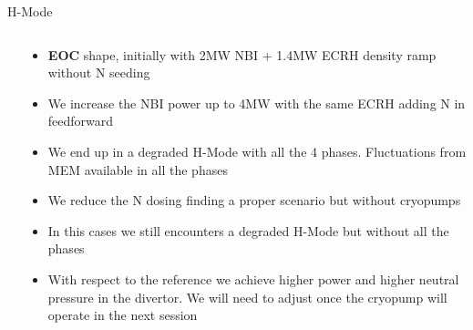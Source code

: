 \documentclass[10pt, compress]{beamer}
\newcommand\Fontvi{\fontsize{8}{7.2}\selectfont}
\begin{document}
\begin{frame}{H-Mode}
\Fontvi
  \vspace{-1cm}
\begin{columns}
  \begin{column}{0.5\textwidth}
  \end{column}
  \begin{column}{0.5\textwidth}
    \begin{itemize}
      \item<1-> \textbf{EOC} shape, initially with 2MW NBI + 1.4MW ECRH
        density ramp without N seeding
      \item<2-> We increase the NBI power up to 4MW with the same ECRH
        adding N in feedforward
      \item<3-> We end up in a degraded H-Mode with all the 4
        phases. Fluctuations from MEM available in all the phases
      \item<4-> We reduce the N dosing finding a proper scenario
        \alert{but without cryopumps}
      \item<5-> In this cases we still encounters a degraded H-Mode but
        without all the phases
      \item<6-> With respect to the reference we achieve higher power
        and higher neutral pressure in the divertor. We will need to
        adjust once the cryopump will operate in the next session 
    \end{itemize}
  \end{column}
\end{columns}
\end{frame}
\end{document}
